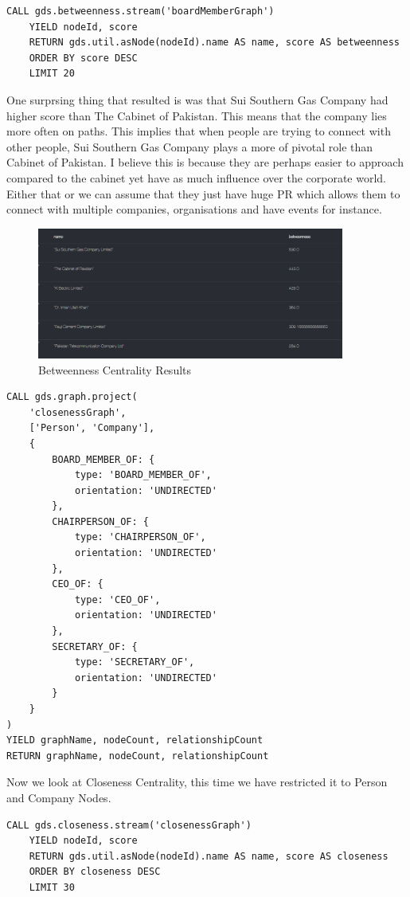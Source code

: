 \documentclass[12pt]{article}
\begin{document}
\begin{lstlisting}[frame=single]
    CALL gds.betweenness.stream('boardMemberGraph')
    YIELD nodeId, score
    RETURN gds.util.asNode(nodeId).name AS name, score AS betweenness
    ORDER BY score DESC
    LIMIT 20
\end{lstlisting}
One surprsing thing that resulted is was that Sui Southern Gas Company had higher score than The Cabinet of Pakistan. This means that the company lies more often on paths. This implies that when people are trying to connect with other people, Sui Southern Gas Company plays a more of pivotal role than Cabinet of Pakistan. I believe this is because they are perhaps easier to approach compared to the cabinet yet have as much influence over the corporate world. Either that or we can assume that they just have huge PR which allows them to connect with multiple companies, organisations and have events for instance.
\begin{figure}
    \centering
    \includegraphics[width=0.9\textwidth]{betweenness.png} 
    \caption{Betweenness Centrality Results}
\end{figure}
\begin{lstlisting}[frame=single]
    CALL gds.graph.project(
    'closenessGraph',
    ['Person', 'Company'],
    {
        BOARD_MEMBER_OF: {
            type: 'BOARD_MEMBER_OF',
            orientation: 'UNDIRECTED'
        },
        CHAIRPERSON_OF: {
            type: 'CHAIRPERSON_OF',
            orientation: 'UNDIRECTED'
        },
        CEO_OF: {
            type: 'CEO_OF',
            orientation: 'UNDIRECTED'
        },
        SECRETARY_OF: {
            type: 'SECRETARY_OF',
            orientation: 'UNDIRECTED'
        }
    }
)
YIELD graphName, nodeCount, relationshipCount
RETURN graphName, nodeCount, relationshipCount

\end{lstlisting}
Now we look at Closeness Centrality, this time we have restricted it to Person and Company Nodes.   
\begin{lstlisting}[frame=single]
    CALL gds.closeness.stream('closenessGraph')
    YIELD nodeId, score
    RETURN gds.util.asNode(nodeId).name AS name, score AS closeness
    ORDER BY closeness DESC
    LIMIT 30
\end{lstlisting}
\end{document}
